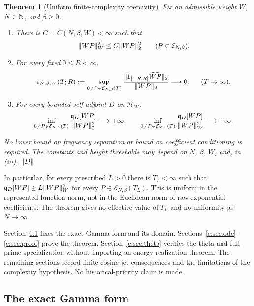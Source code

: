 \documentclass[11pt,a4paper]{article}
\numberwithin{equation}{section}
\newtheorem{theorem}{Theorem}[section]
\theoremstyle{definition}\newtheorem{definition}[theorem]{Definition}
\theoremstyle{remark}\newtheorem{remark}[theorem]{Remark}
\newcommand{\HH}{\mathcal H_W}\newcommand{\XX}{X_W}\newcommand{\EE}{\mathcal E_{N,\beta}}
\newcommand{\qD}{\mathfrak q_D}\newcommand{\qth}{\mathfrak q_\theta}
\begin{document}
\begin{theorem}[Uniform finite-complexity coercivity]\label{e:thm:main}
Fix an admissible weight $W$, $N\in\mathbb N$, and $\beta\ge0$.
\begin{enumerate}[label=\textup{(\roman*)},leftmargin=2.1em]
\item There is $C=C(N,\beta,W)<\infty$ such that
\begin{equation}\label{e:eq:comparison}
 \norm{WP}_W^2\le C\norm{WP}_2^2\qquad(P\in\EE).
\end{equation}
\item For every fixed $0\le R<\infty$,
\begin{equation}\label{e:eq:escape}
 \varepsilon_{N,\beta,W}(T;R):=
 \sup_{0\ne P\in\EE(T)}
 \frac{\norm{\mathbf1_{[-R,R]}\widehat{WP}}_2}{\norm{WP}_2}
 \longrightarrow0\qquad(T\to\infty).
\end{equation}
\item For every bounded self-adjoint $D$ on $\HH$,
\begin{equation}\label{e:eq:coercivity}
 \inf_{0\ne P\in\EE(T)}\frac{\qD[WP]}{\norm{WP}_2^2}
 \longrightarrow+\infty,\qquad
 \inf_{0\ne P\in\EE(T)}\frac{\qD[WP]}{\norm{WP}_W^2}
 \longrightarrow+\infty.
\end{equation}
\end{enumerate}
No lower bound on frequency separation or bound on coefficient
conditioning is required. The constants and height thresholds may depend
on $N$, $\beta$, $W$, and, in \textup{(iii)}, $\lVert D\rVert$.
\end{theorem}

In particular, for every prescribed $L>0$ there is $T_L<\infty$ such that
$\qD[WP]\ge L\norm{WP}_W^2$ for every $P\in\EE(T_L)$.
This is uniform in the represented function norm, not in the Euclidean
norm of raw exponential coefficients. The theorem gives no effective
value of $T_L$ and no uniformity as $N\to\infty$.

Section~\ref{e:sec:gamma} fixes the exact Gamma form and its domain.
Sections~\ref{e:sec:ode}--\ref{e:sec:proof} prove the theorem.
Section~\ref{e:sec:theta} verifies the theta and full-prime specialization
without importing an energy-realization theorem. The remaining sections
record finite cosine-jet consequences and the limitations of the
complexity hypothesis. No historical-priority claim is made.


\subsection{The exact Gamma form}\label{e:sec:gamma}
\end{document}
